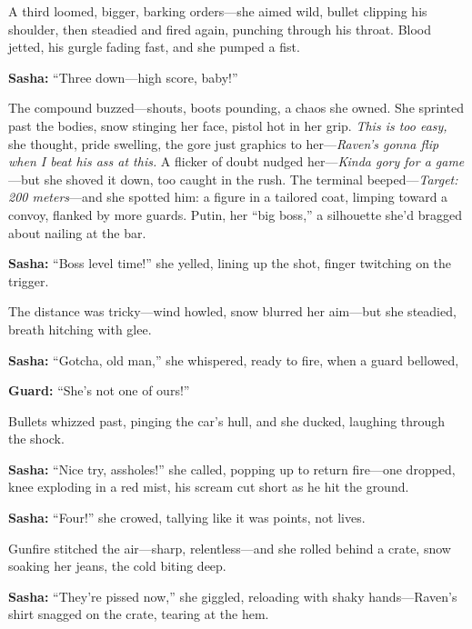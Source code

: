 \documentclass[12pt]{book}
\begin{document}
A third loomed, bigger, barking orders—she aimed wild, bullet clipping his shoulder, then steadied and fired again, punching through his throat. Blood jetted, his gurgle fading fast, and she pumped a fist. 

\vspace{0.5em}
\textbf{Sasha:} “Three down—high score, baby!”

The compound buzzed—shouts, boots pounding, a chaos she owned. She sprinted past the bodies, snow stinging her face, pistol hot in her grip. \emph{This is too easy,} she thought, pride swelling, the gore just graphics to her—\emph{Raven’s gonna flip when I beat his ass at this.} A flicker of doubt nudged her—\emph{Kinda gory for a game}—but she shoved it down, too caught in the rush. The terminal beeped—\emph{Target: 200 meters}—and she spotted him: a figure in a tailored coat, limping toward a convoy, flanked by more guards. Putin, her “big boss,” a silhouette she’d bragged about nailing at the bar.

\vspace{0.5em}
\textbf{Sasha:} “Boss level time!” she yelled, lining up the shot, finger twitching on the trigger.

The distance was tricky—wind howled, snow blurred her aim—but she steadied, breath hitching with glee. 

\vspace{0.5em}
\textbf{Sasha:} “Gotcha, old man,” she whispered, ready to fire, when a guard bellowed, 

\vspace{0.5em}
\textbf{Guard:} “She’s not one of ours!”

Bullets whizzed past, pinging the car’s hull, and she ducked, laughing through the shock. 

\vspace{0.5em}
\textbf{Sasha:} “Nice try, assholes!” she called, popping up to return fire—one dropped, knee exploding in a red mist, his scream cut short as he hit the ground.

\vspace{0.5em}
\textbf{Sasha:} “Four!” she crowed, tallying like it was points, not lives.

Gunfire stitched the air—sharp, relentless—and she rolled behind a crate, snow soaking her jeans, the cold biting deep. 

\vspace{0.5em}
\textbf{Sasha:} “They’re pissed now,” she giggled, reloading with shaky hands—Raven’s shirt snagged on the crate, tearing at the hem.
\end{document}
